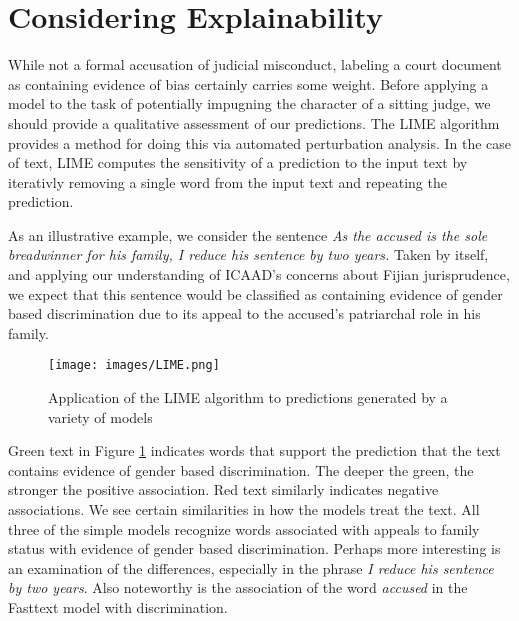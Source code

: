 \documentclass[twocolumn,10pt]{wmrDoc}
\begin{document}
\section{Considering Explainability}
While not a formal accusation of judicial misconduct, labeling a court document as containing evidence of bias certainly carries some weight.  Before applying a model to the task of potentially impugning the character of a sitting judge, we should provide a qualitative assessment of our predictions.  The LIME algorithm \cite{lime} provides a method for doing this via automated perturbation analysis.  In the case of text, LIME computes the sensitivity of a prediction to the input text by iterativly removing a single word from the input text and repeating the prediction.  

As an illustrative example, we consider the sentence \emph{As the accused is the sole breadwinner for his family, I reduce his sentence by two years.}  Taken by itself, and applying our understanding of ICAAD's concerns about Fijian jurisprudence, we expect that this sentence would be classified as containing evidence of gender based discrimination due to its appeal to the accused's patriarchal role in his family.

\begin{figure}[h]
    \centering
    \texttt{[image: images/LIME.png]}
    \caption{Application of the LIME algorithm to predictions generated by a variety of models}
    \label{fig:LIME}
\end{figure}

Green text in Figure \ref{fig:LIME} indicates words that support the prediction that the text contains evidence of gender based discrimination.  The deeper the green, the stronger the positive association.  Red text similarly indicates negative associations.  We see certain similarities in how the models treat the text.  All three of the simple models recognize words associated with appeals to family status with evidence of gender based discrimination.  Perhaps more interesting is an examination of the differences, especially in the phrase \emph{I reduce his sentence by two years}.  Also noteworthy is the association of the word \emph{accused} in the Fasttext model with discrimination.




  
\end{document}
